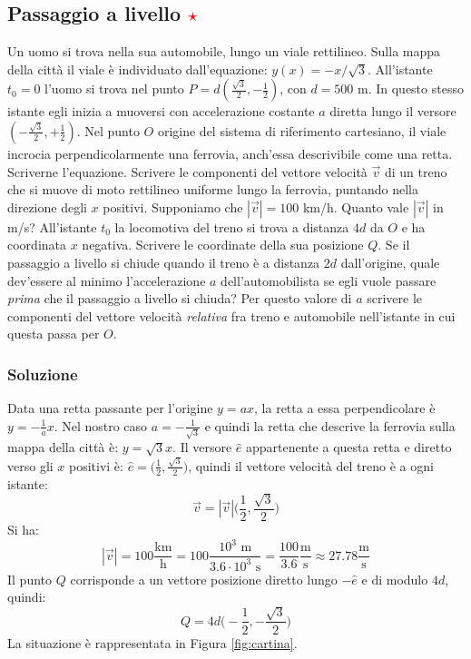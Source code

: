 \documentclass[12pt,a4paper]{book}
\newcommand{\rstar}{ \textcolor{red}{$\star$}}
\begin{document}
\subsection{Passaggio a livello \rstar}
Un uomo si trova nella sua automobile, lungo un viale rettilineo. Sulla mappa della città il viale è individuato 
dall'equazione: $y(x)=-x/\sqrt{3}$. All'istante $t_0=0$ l'uomo si trova nel punto $P=d (\frac{\sqrt{3}}{2}, -\frac{1}{2})$, con $d=500$ m. In questo stesso istante egli inizia a muoversi con accelerazione costante $a$ diretta lungo il versore $(-\frac{\sqrt{3}}{2}, +\frac{1}{2})$. Nel punto $O$ origine del sistema di riferimento cartesiano, il viale incrocia perpendicolarmente una ferrovia, anch'essa descrivibile come una retta. Scriverne l'equazione. Scrivere le componenti del vettore velocità $\vec{v}$ di un treno che si muove di moto rettilineo uniforme lungo la ferrovia, puntando nella direzione degli $x$ positivi. Supponiamo che $|\vec{v}|=100$ km/h.  Quanto vale $|\vec{v}|$ in m/s?  All'istante $t_0$ la locomotiva del treno si trova a distanza $4d$ da $O$ e ha coordinata $x$ negativa. Scrivere le coordinate della sua posizione $Q$. Se il passaggio a livello si chiude quando il treno è a distanza $2d$ dall'origine, quale dev'essere al minimo l'accelerazione $a$ dell'automobilista se egli vuole passare \textit{prima} che il passaggio a livello si chiuda? Per questo valore di $a$ scrivere le componenti del vettore velocità \textit{relativa} fra treno e automobile nell'istante in cui questa passa per $O$.
\subsubsection*{Soluzione}
Data una retta passante per l'origine $y=ax$, la retta a essa perpendicolare 
è $y=-\frac{1}{a}x$. Nel nostro caso $a=-\frac{1}{\sqrt{3}}$ e quindi
la retta che descrive la ferrovia sulla mappa della città è: $y=\sqrt{3}x$. Il versore $\hat{e}$ appartenente a questa retta e diretto verso gli $x$ positivi è: $\hat{e}=\big(\frac{1}{2}, \frac{\sqrt{3}}{2} \big)$, quindi
il vettore velocità del treno è a ogni istante:
%
\begin{equation*}
\vec{v}=|\vec{v}|\big(\frac{1}{2}, \frac{\sqrt{3}}{2} \big)
\end{equation*}
%
Si ha: 
%
\begin{equation*}
|\vec{v}|=100 \frac{\text{km}}{\text{h}}= 100 \frac{10^3 \text{  m}}{3.6 \cdot 10^3 \text{  s}}= \frac{100}{3.6} \frac{\text{m}}{\text{s}} \approx 27.78 \frac{\text{m}}{\text{s}}
\end{equation*}
%
Il punto $Q$ corrisponde a un vettore posizione diretto lungo $-\hat{e}$ e di modulo $4d$, quindi:
%
\begin{equation*}
Q=4d\big(-\frac{1}{2}, -\frac{\sqrt{3}}{2} \big)
\end{equation*}
%
La situazione è rappresentata in Figura \ref{fig:cartina}. 
\end{document}
